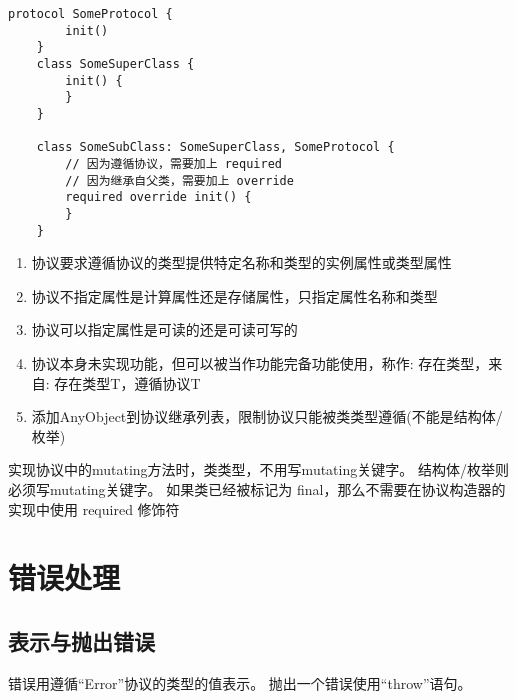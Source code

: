\documentclass{../main.tex}{subfiles}
\begin{document}
\begin{lstlisting}[style = CodeLstStyleSwift, title = {协议构造器+子类重写父类}]
    protocol SomeProtocol {
        init()
    }
    class SomeSuperClass {
        init() {
        }
    }

    class SomeSubClass: SomeSuperClass, SomeProtocol {
        // 因为遵循协议，需要加上 required
        // 因为继承自父类，需要加上 override
        required override init() {
        }
    }
\end{lstlisting}

\begin{enumerate}[itemsep=0pt, parsep=0pt, topsep=0pt, partopsep=0pt]
    \item 协议要求遵循协议的类型提供特定名称和类型的实例属性或类型属性
    \item 协议不指定属性是计算属性还是存储属性，只指定属性名称和类型
    \item 协议可以指定属性是可读的还是可读可写的
    \item 协议本身未实现功能，但可以被当作功能完备功能使用，称作: 存在类型，来自: 存在类型T，遵循协议T
    \item 添加AnyObject到协议继承列表，限制协议只能被类类型遵循(不能是结构体/枚举)
\end{enumerate}
\begin{ArtCaution}
实现协议中的mutating方法时，类类型，不用写mutating关键字。
结构体/枚举则必须写mutating关键字。
如果类已经被标记为 final，那么不需要在协议构造器的实现中使用 required 修饰符
\end{ArtCaution}



\section{错误处理}



\subsection{表示与抛出错误}
错误用遵循``Error''协议的类型的值表示。
抛出一个错误使用``throw''语句。
\end{document}
